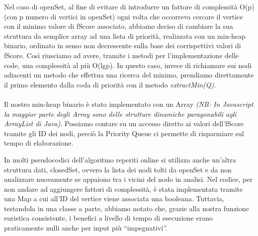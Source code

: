 \documentclass[12pt,a4paper]{report}
\begin{document}
Nel caso di openSet, al fine di evitare di introdurre un fattore di complessità O(p) (con p numero di vertici in openSet) ogni volta che occorreva cercare il vertice con il minimo valore di fScore associato, abbiamo deciso di cambiare la sua struttura da semplice array ad una lista di priorità, realizzata con un min-heap binario, ordinato in senso non decrescente sulla base dei corrispettivi valori di fScore. Così riusciamo ad avere, tramite i metodi per l'implementazione delle code, una complessità al più O(lgp). 
In questo caso, invece di richiamare sui nodi adiacenti un metodo che effettua una ricerca del minimo, prendiamo direttamente il primo elemento dalla coda di priorità con il metodo \emph{extractMin(Q)}.\\ \\
Il nostro min-heap binario è stato implementato con un Array \emph{(NB: In Javascript la maggior parte degli Array sono delle strutture dinamiche paragonabili agli ArrayList di Java)}. Possiamo contare su un accesso diretto ai valori dell'fScore tramite gli ID dei nodi, perciò la Priority Queue ci permette di risparmiare sul tempo di elaborazione.


In molti pseudocodici dell'algoritmo reperiti online si utilizza anche un'altra struttura dati, closedSet, ovvero la lista dei nodi tolti da openSet e da non analizzare nuovamente se appaiono tra i vicini del nodo in analisi. Nel codice, per non andare ad aggiungere fattori di complessità, è stata implementata tramite una Map a cui all'ID del vertice viene associata una booleana. Tuttavia, testandola in una classe a parte, abbiamo notato che, grazie alla nostra funzione euristica consistente, i benefici a livello di tempo di esecuzione erano praticamente nulli anche per input più “impegnativi”. 
\end{document}
